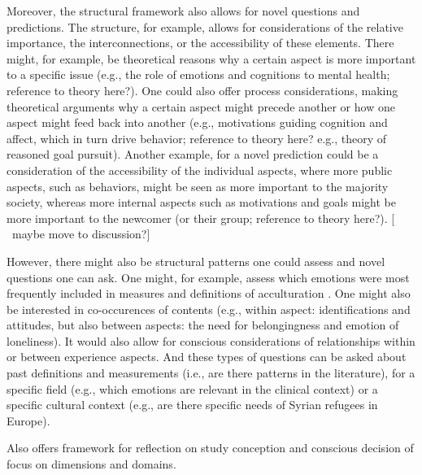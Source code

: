 \documentclass[man, 12pt, a4paper]{apa7}
\newcommand\Warning[1][2ex]{%
  \renewcommand\stacktype{L}%
  \scaleto{\stackon[1.3pt]{\color{red}$\triangle$}{\tiny\bfseries !}}{#1}}%
\begin{document}
Moreover, the structural framework also allows for novel questions and predictions. The structure, for example, allows for considerations of the relative importance, the interconnections, or the accessibility of these elements. There might, for example, be theoretical reasons why a certain aspect is more important to a specific issue (e.g., the role of emotions and cognitions to mental health; reference to theory here?). One could also offer process considerations, making theoretical arguments why a certain aspect might precede another or how one aspect might feed back into another (e.g., motivations guiding cognition and affect, which in turn drive behavior; reference to theory here? e.g., theory of reasoned goal pursuit). Another example, for a novel prediction could be a consideration of the accessibility of the individual aspects, where more public aspects, such as behaviors, might be seen as more important to the majority society, whereas more internal aspects such as motivations and goals might be more important to the newcomer (or their group; reference to theory here?). [\Warning\ maybe move to discussion?]

However, there might also be structural patterns one could assess and novel questions one can ask. One might, for example, assess which emotions were most frequently included in measures and definitions of acculturation \citep[e.g., specific emotions such as anger or pride, but also types of emotions, such as positive or negative, or about yourself or others;][]{DeLeersnyder2017}. One might also be interested in co-occurences of contents (e.g., within aspect: identifications and attitudes, but also between aspects: the need for belongingness and emotion of loneliness). It would also allow for conscious considerations of relationships within or between experience aspects. And these types of questions can be asked about past definitions and measurements (i.e., are there patterns in the literature), for a specific field (e.g., which emotions are relevant in the clinical context) or a specific cultural context (e.g., are there specific needs of Syrian refugees in Europe). 

Also offers framework for reflection on study conception and conscious decision of focus on dimensions and domains.
\end{document}
